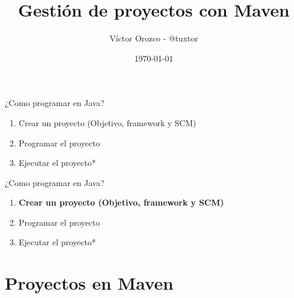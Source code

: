 \documentclass[aspectratio=169]{beamer}
\title{Gestión de proyectos con Maven}
\author{Víctor Orozco - @tuxtor}
\institute{Academik}
\date{\today}
\begin{document}
{
    \frame{\titlepage}
}



\begin{frame}{¿Como programar en Java?}
\begin{enumerate}
	\item Crear un proyecto (Objetivo, framework y SCM)
	\item Programar el proyecto
	\item Ejecutar el proyecto*
\end{enumerate}
\end{frame}

\begin{frame}{¿Como programar en Java?}
\begin{enumerate}
	\item \textbf{Crear un proyecto (Objetivo, framework y SCM)}
	\item Programar el proyecto
	\item Ejecutar el proyecto*
\end{enumerate}
\end{frame}

{
    \section{Proyectos en Maven}
}
\end{document}
